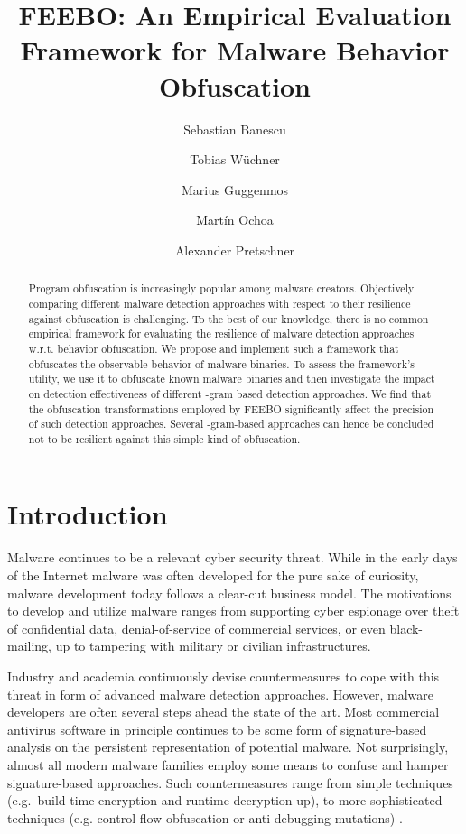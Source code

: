\documentclass{llncs}
\newcommand{\done}[1]{}
\begin{document}
\title{FEEBO: An Empirical Evaluation Framework for Malware Behavior Obfuscation}


\author{Sebastian Banescu \and Tobias W\"uchner \and Marius Guggenmos \and Mart\'in Ochoa \and Alexander Pretschner}

\maketitle

\begin{abstract}
Program obfuscation is increasingly popular among malware creators. Objectively comparing different malware 
detection approaches with respect to their resilience against obfuscation is
challenging. To the best of our knowledge, there is no common empirical 
framework for evaluating the resilience of malware detection approaches w.r.t. behavior obfuscation.
We propose and implement such a framework that obfuscates the observable behavior of malware binaries. 
To assess the framework's utility, we use it to obfuscate 
known malware binaries and then investigate the impact on detection 
effectiveness of different -gram based detection approaches.
We find that the obfuscation transformations employed by FEEBO significantly affect the precision of such detection approaches.	Several -gram-based approaches can hence be concluded not to be resilient against this simple kind of obfuscation.
\end{abstract}

\section{Introduction}
\done{TW: consolidate terms: event vs. call; profile vs. configuration vs. setting}
Malware continues to be a relevant cyber security threat. While in the early days of the Internet malware was often developed for the pure sake of curiosity, malware development today follows a clear-cut business model. The motivations to develop and utilize malware ranges from supporting cyber espionage over theft of confidential data, denial-of-service of commercial services, or even black-mailing, up to tampering with military or civilian infrastructures.

Industry and academia continuously devise countermeasures to cope with this threat in form of advanced malware detection approaches. However, malware developers are often several steps ahead the state of the art. 
Most commercial antivirus software in principle continues to be some form of signature-based analysis on the persistent representation of potential malware. Not surprisingly, almost all modern malware families employ some means to confuse and hamper signature-based approaches. Such countermeasures range from simple techniques (e.g.~build-time encryption and runtime decryption up), to more sophisticated techniques (e.g. control-flow obfuscation or anti-debugging mutations) \cite{Collberg2009}. 
\end{document}
